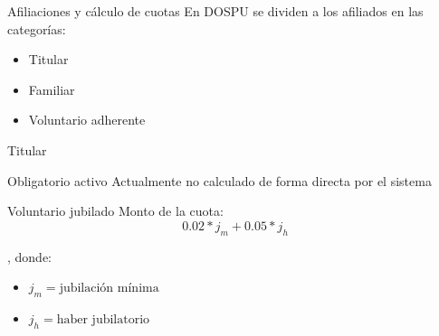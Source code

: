 \documentclass[10pt]{beamer}
\begin{document}
\begin{frame}{Afiliaciones y cálculo de cuotas}
    En DOSPU se dividen a los afiliados en las categorías:
    \begin{itemize}
        \item Titular
        \item Familiar
        \item Voluntario adherente
    \end{itemize}
\end{frame}
\begin{comment}
De las ordenanzas que dictan las normativas de DOSPU, podemos ver que los afiliados estan divididos en tres subcategorías:
- Titular
- Familiar, de un afiliado titular
- Voluntario Adherente
\end{comment}

\begin{frame}{Titular}
    \begin{block}{Obligatorio activo}
        Actualmente no calculado de forma directa por el sistema
    \end{block}
    \begin{block}{Voluntario jubilado}
        Monto de la cuota:
        \begin{displaymath}
        0.02 * j_m + 0.05 * j_h
        \end{displaymath}

        , donde:
        \begin{itemize}
            \item $j_m = \text{jubilación mínima}$
            \item $j_h = \text{haber jubilatorio}$
        \end{itemize}
    \end{block}
\end{frame}
\begin{comment}
Los titulares, a su vez, se dividen en:
- Obligatorio activo: agentes que se encuentren en actividad, como docentes, por ejemplos.
    Actualmente, no calculado de forma directa por el sistema, con lo cual queda fuera del alcance de este trabajo.
- Jubilados voluntarios: previamente obligatorios activos que optan por continuar estando afiliados.
Su cuota está calculada por la fórmula (fórmula en la diapositiva.)

Dos consideraciones adicionales que se extrajeron del código fuente del sistema, es que en caso de que dos afiliados voluntarios jubilados tengan registrado un vínculo de cónyuge, se aplica un descuento de 30%

En caso de no tener un haber jubilatorio, en lugar de utilizarse la fórmula mostrada, se utiliza valor de referencia
\end{comment}
\end{document}
